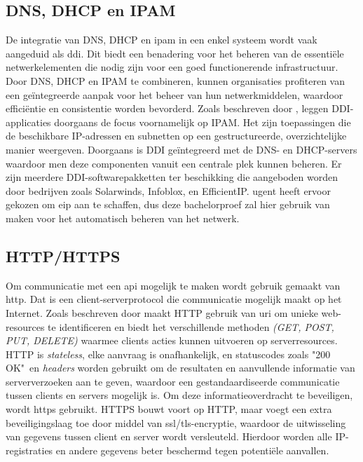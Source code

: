 \subsection{DNS, DHCP en IPAM}
De integratie van DNS, DHCP en \acrshort{ipam} in een enkel systeem wordt vaak aangeduid als \acrshort{ddi}. Dit biedt een benadering voor het beheren van de essentiële netwerkelementen die nodig zijn voor een goed functionerende infrastructuur. Door DNS, DHCP en IPAM te combineren, kunnen organisaties profiteren van een geïntegreerde aanpak voor het beheer van hun netwerkmiddelen, waardoor efficiëntie en consistentie worden bevorderd. Zoals beschreven door \textcite{Fontein2023}, leggen DDI-applicaties doorgaans de focus voornamelijk op IPAM. Het zijn toepassingen die de beschikbare IP-adressen en subnetten op een gestructureerde, overzichtelijke manier weergeven. Doorgaans is DDI geïntegreerd met de DNS- en DHCP-servers waardoor men deze componenten vanuit een centrale plek kunnen beheren. Er zijn meerdere DDI-softwarepakketten ter beschikking die aangeboden worden door bedrijven zoals Solarwinds, Infoblox, en EfficientIP. \acrshort{ugent} heeft ervoor gekozen om \acrlong{eip} aan te schaffen, dus deze bachelorproef zal hier gebruik van maken voor het automatisch beheren van het netwerk.

\subsection{HTTP/HTTPS}
Om communicatie met een \acrshort{api} mogelijk te maken wordt gebruik gemaakt van \acrfull{http}. Dat is een client-serverprotocol die communicatie mogelijk maakt op het Internet. Zoals beschreven door \textcite{Fielding2014} maakt HTTP gebruik van \acrfull{uri} om unieke web-resources te identificeren en biedt het verschillende methoden \textit{(GET, POST, PUT, DELETE)} waarmee clients acties kunnen uitvoeren op serverresources. HTTP is \textit{stateless}, elke aanvraag is onafhankelijk, en statuscodes zoals "200 OK"\ en \textit{headers} worden gebruikt om de resultaten en aanvullende informatie van serververzoeken aan te geven, waardoor een gestandaardiseerde communicatie tussen clients en servers mogelijk is.
Om deze informatieoverdracht te beveiligen, wordt \acrfull{https} gebruikt. HTTPS bouwt voort op HTTP, maar voegt een extra beveiligingslaag toe door middel van \acrshort{ssl}/\acrshort{tls}-encryptie, waardoor de uitwisseling van gegevens tussen client en server wordt versleuteld. Hierdoor worden alle IP-registraties en andere gegevens beter beschermd tegen potentiële aanvallen.

